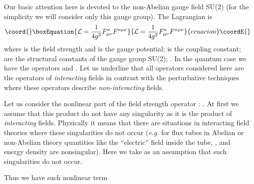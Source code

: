 \documentclass[a4paper,a4paper]{article}
\begin{document}
Our basic attention here is devoted to the non-Abelian gauge field 
SU(2) (for the simplicity we will consider only this gauge group). 
The Lagrangian is 
\begin{equation}\coord{}\boxEquation{
\mathcal L = \frac{1}{4g^2}F^a_{\mu \nu} F^{a\mu \nu}
\label{sec1-10}
}{
\mathcal L = \frac{1}{4g^2}F^a_{\mu \nu} F^{a\mu \nu}
}{ecuacion}\coordE{}\end{equation}
where \coordHE{} is the field strength and \coordHE{} 
is the gauge potential; \coordHE{} is the coupling constant; 
\coordHE{} are the structural constants of the  
gauge group SU(2); \coordHE{}. In the quantum case we have the operators 
\coordHE{} and \coordHE{}. 
Let us underline that all operators considered here are the operators 
of \textit{interacting} fields in contrast with the perturbative 
techniques where these operators describe \textit{non-interacting} 
fields. 
\par 
Let us consider the nonlinear part of the field strength operator  
\coordHE{} : 
\coordHE{}. 
At first we assume 
that this product do not have any singularity as it is the product 
of \textit{interacting} fields. Physically 
it means that there are situations in interacting 
field theories where these singularities do not occur 
({\it e.g.} for flux tubes in Abelian or non-Abelian theory 
quantities like the ``electric'' field inside the tube, 
\coordHE{}, and energy density 
\coordHE{} are 
nonsingular). Here we take as an assumption that such singularities 
do not occur. 
\par 
Thus we have such nonlinear term 
\end{document}
